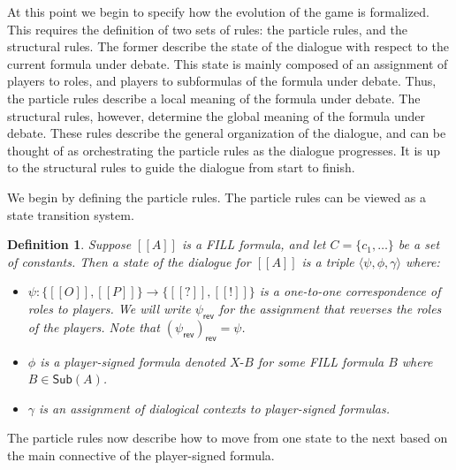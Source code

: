 \documentclass{article}
\newtheorem{definition}[theorem]{Definition}
\begin{document}
At this point we begin to specify how the evolution of the game is
formalized.  This requires the definition of two sets of rules: the
particle rules, and the structural rules.  The former describe the
state of the dialogue with respect to the current formula under
debate. This state is mainly composed of an assignment of players to
roles, and players to subformulas of the formula under debate.  Thus,
the particle rules describe a local meaning of the formula under
debate.  The structural rules, however, determine the global meaning
of the formula under debate.  These rules describe the general
organization of the dialogue, and can be thought of as orchestrating
the particle rules as the dialogue progresses.  It is up to the
structural rules to guide the dialogue from start to finish.

We begin by defining the particle rules.  The particle rules can be
viewed as a state transition system. 
\begin{definition}
  \label{def:particle-rules-state}
  Suppose $[[A]]$ is a FILL formula, and let $C = \{c_1,\ldots \}$ be
  a set of constants.  Then a \emph{state} of the dialogue for $[[A]]$
  is a triple $\langle \psi,\phi,\gamma \rangle$ where:
  \begin{center}
    \begin{itemize}
    \item $\psi : \{[[O]],[[P]]\} \to \{[[?]],[[!]]\}$ is a
      one-to-one correspondence of roles to players.  We will write
      $\psi_{\mathsf{rev}}$ for the assignment that reverses the roles
      of the players.  Note that $(\psi_{\mathsf{rev}})_{\mathsf{rev}}
      = \psi$.
    \item $\phi$ is a player-signed formula denoted $X\text{-}B$ for some
      FILL formula $B$ where $B \in \mathsf{Sub}(A)$.
    \item $\gamma$ is an assignment of dialogical contexts to
      player-signed formulas.
    \end{itemize}
  \end{center}
\end{definition}
The particle rules now describe how to move from one state to the next
based on the main connective of the player-signed formula.  
\newcommand{\psii}[0]{\psi^{-1}}
\end{document}
